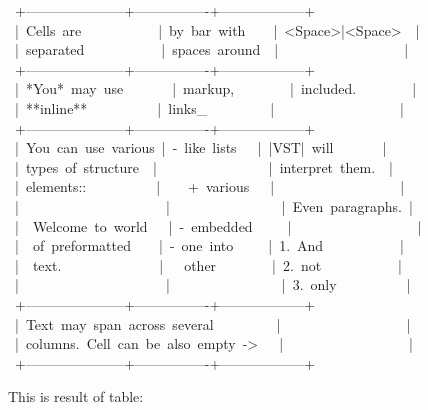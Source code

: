 \documentclass[12pt]{article}
\begin{document}
\begin{ttfamily}\begin{flushleft}
\mbox{~+---------------------+----------------+------------------+}\\
\mbox{~|~Cells~are~~~~~~~~~~~|~by~bar~with~~~~|~<Space>|<Space>~~|}\\
\mbox{~|~separated~~~~~~~~~~~|~spaces~around~~|~~~~~~~~~~~~~~~~~~|}\\
\mbox{~+---------------------+----------------+------------------+}\\
\mbox{~|~*You*~may~use~~~~~~~|~markup,~~~~~~~~|~included.~~~~~~~~|}\\
\mbox{~|~**inline**~~~~~~~~~~|~links\_~~~~~~~~~|~~~~~~~~~~~~~~~~~~|}\\
\mbox{~+---------------------+----------------+------------------+}\\
\mbox{~|~You~can~use~various~|~-~like~lists~~~|~|VST|~will~~~~~~~|}\\
\mbox{~|~types~of~structure~~|~~~~~~~~~~~~~~~~|~interpret~them.~~|}\\
\mbox{~|~elements::~~~~~~~~~~|~~~~+~various~~~|~~~~~~~~~~~~~~~~~~|}\\
\mbox{~|~~~~~~~~~~~~~~~~~~~~~|~~~~~~~~~~~~~~~~|~Even~paragraphs.~|}\\
\mbox{~|~~Welcome~to~world~~~|~-~embedded~~~~~|~~~~~~~~~~~~~~~~~~|}\\
\mbox{~|~~of~preformatted~~~~|~-~one~into~~~~~|~1.~And~~~~~~~~~~~|}\\
\mbox{~|~~text.~~~~~~~~~~~~~~|~~~other~~~~~~~~|~2.~not~~~~~~~~~~~|}\\
\mbox{~|~~~~~~~~~~~~~~~~~~~~~|~~~~~~~~~~~~~~~~|~3.~only~~~~~~~~~~|}\\
\mbox{~+---------------------+----------------+------------------+}\\
\mbox{~|~Text~may~span~across~several~~~~~~~~~|~~~~~~~~~~~~~~~~~~|}\\
\mbox{~|~columns.~Cell~can~be~also~empty~->~~~|~~~~~~~~~~~~~~~~~~|}\\
\mbox{~+---------------------+----------------+------------------+}\\
\end{flushleft}\end{ttfamily}

This is result of table:
\end{document}

